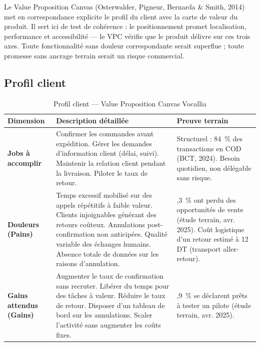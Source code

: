 Le Value Proposition Canvas (Osterwalder, Pigneur, Bernarda \& Smith, 2014) met en correspondance explicite le profil du client avec la carte de valeur du produit. Il sert ici de test de cohérence : le positionnement promet localisation, performance et accessibilité --- le VPC vérifie que le produit délivre sur ces trois axes. Toute fonctionnalité sans douleur correspondante serait superflue ; toute promesse sans ancrage terrain serait un risque commercial.

\subsection{Profil client}
\label{section3.3.1}

\begin{table}[H]
\centering
\caption{Profil client --- Value Proposition Canvas Vocallia}
\vspace{4pt}
\begin{tabularx}{\textwidth}{|>{\raggedright\arraybackslash}p{2.5cm}|>{\raggedright\arraybackslash}X|>{\raggedright\arraybackslash}X|}
\hline
\textbf{Dimension} & \textbf{Description détaillée} & \textbf{Preuve terrain} \\
\hline
\textbf{Jobs à accomplir} & Confirmer les commandes avant expédition. Gérer les demandes d'information client (délai, suivi). Maintenir la relation client pendant la livraison. Piloter le taux de retour. & Structurel : 84~\% des transactions en COD (BCT, 2024). Besoin quotidien, non délégable sans risque. \\
\hline
\textbf{Douleurs (Pains)} & Temps excessif mobilisé sur des appels répétitifs à faible valeur. Clients injoignables générant des retours coûteux. Annulations post-confirmation non anticipées. Qualité variable des échanges humains. Absence totale de données sur les raisons d'annulation. & 77,3~\% ont perdu des opportunités de vente (étude terrain, avr. 2025). Coût logistique d'un retour estimé à 12 DT (transport aller-retour). \\
\hline
\textbf{Gains attendus (Gains)} & Augmenter le taux de confirmation sans recruter. Libérer du temps pour des tâches à valeur. Réduire le taux de retour. Disposer d'un tableau de bord sur les annulations. Scaler l'activité sans augmenter les coûts fixes. & 90,9~\% se déclarent prêts à tester un pilote (étude terrain, avr. 2025). \\
\hline
\end{tabularx}
\end{table}

